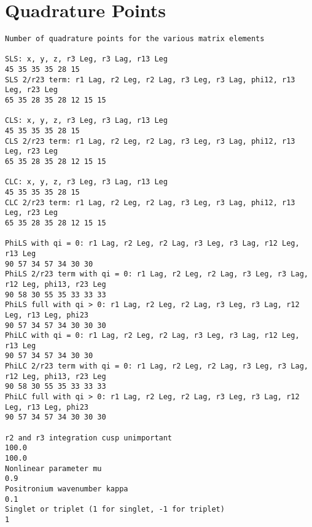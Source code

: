 \documentclass[Dissertation.tex]{subfiles}
\begin{document}
\section{Quadrature Points}
\label{sec:QuadraturePoints}
\begin{lstlisting}[caption=Base set of integration points in parameterfilepvr.txt]
Number of quadrature points for the various matrix elements

SLS: x, y, z, r3 Leg, r3 Lag, r13 Leg
45 35 35 35 28 15
SLS 2/r23 term: r1 Lag, r2 Leg, r2 Lag, r3 Leg, r3 Lag, phi12, r13 Leg, r23 Leg
65 35 28 35 28 12 15 15

CLS: x, y, z, r3 Leg, r3 Lag, r13 Leg
45 35 35 35 28 15
CLS 2/r23 term: r1 Lag, r2 Leg, r2 Lag, r3 Leg, r3 Lag, phi12, r13 Leg, r23 Leg
65 35 28 35 28 12 15 15

CLC: x, y, z, r3 Leg, r3 Lag, r13 Leg
45 35 35 35 28 15
CLC 2/r23 term: r1 Lag, r2 Leg, r2 Lag, r3 Leg, r3 Lag, phi12, r13 Leg, r23 Leg
65 35 28 35 28 12 15 15

PhiLS with qi = 0: r1 Lag, r2 Leg, r2 Lag, r3 Leg, r3 Lag, r12 Leg, r13 Leg
90 57 34 57 34 30 30
PhiLS 2/r23 term with qi = 0: r1 Lag, r2 Leg, r2 Lag, r3 Leg, r3 Lag, r12 Leg, phi13, r23 Leg
90 58 30 55 35 33 33 33
PhiLS full with qi > 0: r1 Lag, r2 Leg, r2 Lag, r3 Leg, r3 Lag, r12 Leg, r13 Leg, phi23
90 57 34 57 34 30 30 30
PhiLC with qi = 0: r1 Lag, r2 Leg, r2 Lag, r3 Leg, r3 Lag, r12 Leg, r13 Leg
90 57 34 57 34 30 30
PhiLC 2/r23 term with qi = 0: r1 Lag, r2 Leg, r2 Lag, r3 Leg, r3 Lag, r12 Leg, phi13, r23 Leg
90 58 30 55 35 33 33 33
PhiLC full with qi > 0: r1 Lag, r2 Leg, r2 Lag, r3 Leg, r3 Lag, r12 Leg, r13 Leg, phi23
90 57 34 57 34 30 30 30

r2 and r3 integration cusp unimportant
100.0
100.0
Nonlinear parameter mu
0.9
Positronium wavenumber kappa
0.1
Singlet or triplet (1 for singlet, -1 for triplet)
1
\end{lstlisting}
\end{document}
